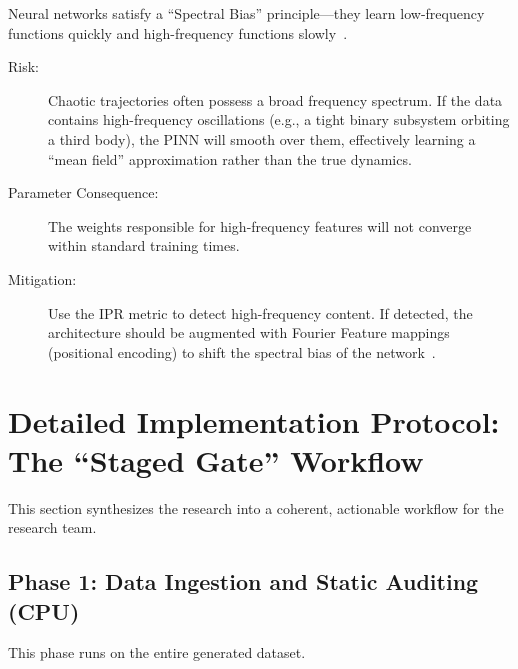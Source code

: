 \documentclass[11pt, a4paper]{article}
\begin{document}
Neural networks satisfy a ``Spectral Bias'' principle—they learn low-frequency functions quickly and high-frequency functions slowly~\cite{ref8}.
\begin{description}
    \item[Risk:] Chaotic trajectories often possess a broad frequency spectrum. If the data contains high-frequency oscillations (e.g., a tight binary subsystem orbiting a third body), the PINN will smooth over them, effectively learning a ``mean field'' approximation rather than the true dynamics.
    \item[Parameter Consequence:] The weights responsible for high-frequency features will not converge within standard training times.
    \item[Mitigation:] Use the IPR metric to detect high-frequency content. If detected, the architecture should be augmented with Fourier Feature mappings (positional encoding) to shift the spectral bias of the network~\cite{ref8}.
\end{description}

\section{Detailed Implementation Protocol: The ``Staged Gate'' Workflow}

This section synthesizes the research into a coherent, actionable workflow for the research team.

\subsection{Phase 1: Data Ingestion and Static Auditing (CPU)}
This phase runs on the entire generated dataset.
\end{document}
